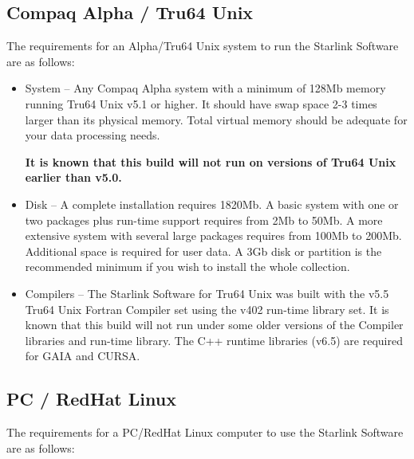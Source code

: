 \documentclass[twoside,11pt]{article}
\newcommand{\xlabel}[1]{}
\renewcommand{\_}{\texttt{\symbol{95}}}
\newcommand{\cdrom}{CD--ROM}
\newcommand{\cdrom}{CD-ROM}
\newcommand{\cdroms}{CD--ROMs}
\newcommand{\cdroms}{CD-ROMs}
\newcommand{\axpfull}{1820Mb}
\begin{document}
 
\subsection{\xlabel{dec_alpha_digital_unix}Compaq Alpha / Tru64 Unix}
\label{dec_alpha_digital_unix}

The requirements for an Alpha/Tru64 Unix system to run the Starlink Software
are as follows:

\begin{itemize}

\item System -- Any Compaq Alpha system with a minimum of 128Mb memory
running Tru64 Unix v5.1 or higher.  It should have swap space 2-3
times larger than its physical memory.  Total virtual memory should be 
adequate for your data processing needs.

\textbf{It is known that this build will not run on versions of Tru64
Unix earlier than v5.0.}

\item Disk -- A complete installation requires \axpfull.
A basic system with one or two packages plus run-time support requires
from 2Mb to 50Mb.  A more extensive system with several large packages
requires from 100Mb to 200Mb.   Additional space is required for user
data.  A 3Gb disk or partition is the recommended minimum if you wish
to install the whole collection.

\item Compilers -- The Starlink Software for Tru64 Unix was built
with the v5.5 Tru64 Unix Fortran Compiler set using the v402 run-time
library set.  It is known that this build will not run under some older
versions of the Compiler libraries and run-time library.  The C++ runtime
libraries (v6.5) are required for GAIA and CURSA.

\end{itemize}

\subsection{\xlabel{intel_pc_linux}PC / RedHat Linux}
\label{intel_pc_linux}

The requirements for a PC/RedHat Linux computer to use the Starlink Software
are as follows:
\end{document}
